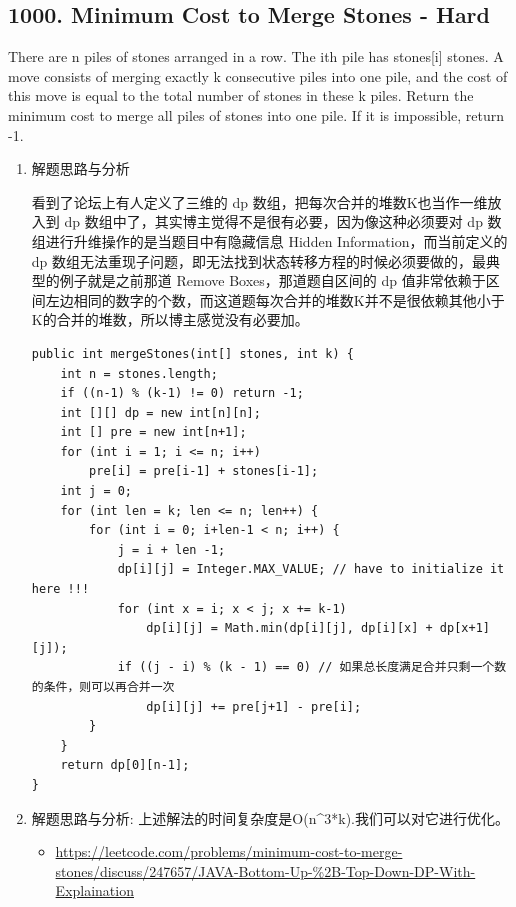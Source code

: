 \documentclass[9pt, b5paaper]{book}
\begin{document}
\subsection{1000. Minimum Cost to Merge Stones - Hard}
\label{sec-1-3-4}
There are n piles of stones arranged in a row. The ith pile has stones[i] stones.
A move consists of merging exactly k consecutive piles into one pile, and the cost of this move is equal to the total number of stones in these k piles.
Return the minimum cost to merge all piles of stones into one pile. If it is impossible, return -1.
\begin{enumerate}
\item 解题思路与分析
\label{sec-1-3-4-1}

看到了论坛上有人定义了三维的 dp 数组，把每次合并的堆数K也当作一维放入到 dp 数组中了，其实博主觉得不是很有必要，因为像这种必须要对 dp 数组进行升维操作的是当题目中有隐藏信息 Hidden Information，而当前定义的 dp 数组无法重现子问题，即无法找到状态转移方程的时候必须要做的，最典型的例子就是之前那道 Remove Boxes，那道题自区间的 dp 值非常依赖于区间左边相同的数字的个数，而这道题每次合并的堆数K并不是很依赖其他小于K的合并的堆数，所以博主感觉没有必要加。

\begin{verbatim}
public int mergeStones(int[] stones, int k) {
    int n = stones.length;
    if ((n-1) % (k-1) != 0) return -1;
    int [][] dp = new int[n][n];
    int [] pre = new int[n+1];
    for (int i = 1; i <= n; i++) 
        pre[i] = pre[i-1] + stones[i-1];
    int j = 0;
    for (int len = k; len <= n; len++) {
        for (int i = 0; i+len-1 < n; i++) {
            j = i + len -1;
            dp[i][j] = Integer.MAX_VALUE; // have to initialize it here !!!
            for (int x = i; x < j; x += k-1) 
                dp[i][j] = Math.min(dp[i][j], dp[i][x] + dp[x+1][j]);
            if ((j - i) % (k - 1) == 0) // 如果总长度满足合并只剩一个数的条件，则可以再合并一次
                dp[i][j] += pre[j+1] - pre[i];
        }
    }
    return dp[0][n-1];
}
\end{verbatim}
\item 解题思路与分析: 上述解法的时间复杂度是O(n\^{}3*k).我们可以对它进行优化。
\label{sec-1-3-4-2}
\begin{itemize}
\item \url{https://leetcode.com/problems/minimum-cost-to-merge-stones/discuss/247657/JAVA-Bottom-Up-\%2B-Top-Down-DP-With-Explaination}
\end{itemize}


\end{enumerate}
\end{document}
